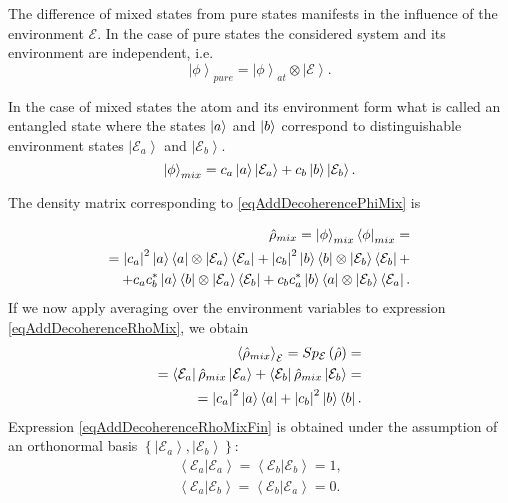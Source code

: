 The difference of mixed states from pure states manifests in the influence of the environment
$\mathcal{E}$. In the case of pure states the considered system and its
environment are independent, i.e.
\begin{equation}
\left|\phi\right>_{pure} = \left|\phi\right>_{at} \otimes
\left|\mathcal{E}\right>.
\label{eqAddDecoherencePhiPure}
\end{equation}

In the case of mixed states the atom and its environment form what is called an entangled state where the states
$\ket{a}$ and $\ket{b}$ correspond to distinguishable 
environment states $\left|\mathcal{E}_a\right>$ and
$\left|\mathcal{E}_b\right>$.
\begin{equation}
\left|\phi\right>_{mix} = c_a\ket{a} \left|\mathcal{E}_a\right>
+ c_b\ket{b} \left|\mathcal{E}_b\right>.
\label{eqAddDecoherencePhiMix}
\end{equation}

The density matrix 
corresponding to \eqref{eqAddDecoherencePhiMix} is

\begin{eqnarray}
\hat{\rho}_{mix} = \left|\phi\right>_{mix}\left<\phi\right|_{mix} = 
\nonumber \\
= 
\left|c_a\right|^2 \ket{a}\bra{a} \otimes
\left|\mathcal{E}_a\right>\left<\mathcal{E}_a\right| + 
\left|c_b\right|^2 \ket{b}\bra{b} \otimes
\left|\mathcal{E}_b\right>\left<\mathcal{E}_b\right| +
\nonumber \\
+
c_a c_b^{\ast}\ket{a}\bra{b} \otimes
\left|\mathcal{E}_a\right>\left<\mathcal{E}_b\right| +
c_b c_a^{\ast}\ket{b}\bra{a} \otimes
\left|\mathcal{E}_b\right>\left<\mathcal{E}_a\right|.
\label{eqAddDecoherenceRhoMix}
\end{eqnarray}
If we now apply averaging over the environment variables to expression \eqref{eqAddDecoherenceRhoMix},
we obtain
\begin{eqnarray}
\left<\hat{\rho}_{mix}\right>_{\mathcal{E}} = 
Sp_{\mathcal{E}}\left(\hat{\rho}\right) = 
\nonumber \\
=
\left<\mathcal{E}_a\right|\hat{\rho}_{mix}\left|\mathcal{E}_a\right> +
\left<\mathcal{E}_b\right|\hat{\rho}_{mix}\left|\mathcal{E}_b\right>
= 
\nonumber \\
= \left|c_a\right|^2 \ket{a}\bra{a} + 
\left|c_b\right|^2 \ket{b}\bra{b}.
\label{eqAddDecoherenceRhoMixFin}
\end{eqnarray}
Expression  \eqref{eqAddDecoherenceRhoMixFin} is obtained under the assumption
of an orthonormal basis $\left\{\left|\mathcal{E}_a\right>,
\left|\mathcal{E}_b\right>\right\}$: 
\begin{eqnarray}
\left<\mathcal{E}_a\right.\left|\mathcal{E}_a\right> = 
\left<\mathcal{E}_b\right.\left|\mathcal{E}_b\right> = 1,
\nonumber \\
\left<\mathcal{E}_a\right.\left|\mathcal{E}_b\right> = 
\left<\mathcal{E}_b\right.\left|\mathcal{E}_a\right> = 0.
\label{eqAddDecoherenceMixECond}
\end{eqnarray}

